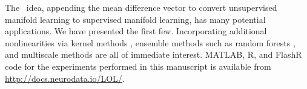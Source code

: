 \documentclass[10pt]{article}
\begin{document}




% 
The \Lol~idea, appending the mean difference vector to convert unsupervised manifold learning to supervised manifold learning, has many potential applications.  We have presented the first few.  Incorporating additional nonlinearities via kernel methods \cite{Mika1999a}, ensemble methods such as random forests \cite{Breiman2001a}, and multiscale methods \cite{Allard2012}
are all of immediate interest. MATLAB, R, and FlashR code for the experiments performed in this manuscript is available from \url{http://docs.neurodata.io/LOL/}.


\clearpage
\end{document}

